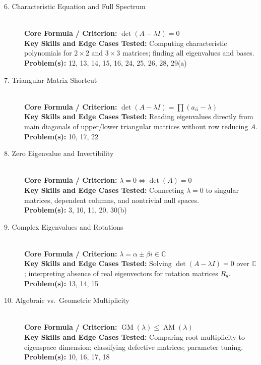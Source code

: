\documentclass[11pt, letterpaper]{article}
\theoremstyle{definition}
\theoremstyle{remark}
\begin{document}
\begin{description}
    \item[6. Characteristic Equation and Full Spectrum] \hfill \\
    \textbf{Core Formula / Criterion:} $\det(A - \lambda I) = 0$ \\
    \textbf{Key Skills and Edge Cases Tested:} Computing characteristic polynomials for $2\times 2$ and $3\times 3$ matrices; finding all eigenvalues and bases. \\
    \textbf{Problem(s):} 12, 13, 14, 15, 16, 24, 25, 26, 28, 29(a)

    \item[7. Triangular Matrix Shortcut] \hfill \\
    \textbf{Core Formula / Criterion:} $\det(A - \lambda I) = \prod (a_{ii} - \lambda)$ \\
    \textbf{Key Skills and Edge Cases Tested:} Reading eigenvalues directly from main diagonals of upper/lower triangular matrices without row reducing $A$. \\
    \textbf{Problem(s):} 10, 17, 22

    \item[8. Zero Eigenvalue and Invertibility] \hfill \\
    \textbf{Core Formula / Criterion:} $\lambda = 0 \iff \det(A) = 0$ \\
    \textbf{Key Skills and Edge Cases Tested:} Connecting $\lambda = 0$ to singular matrices, dependent columns, and nontrivial null spaces. \\
    \textbf{Problem(s):} 3, 10, 11, 20, 30(b)

    \item[9. Complex Eigenvalues and Rotations] \hfill \\
    \textbf{Core Formula / Criterion:} $\lambda = \alpha \pm \beta i \in \mathbb{C}$ \\
    \textbf{Key Skills and Edge Cases Tested:} Solving $\det(A - \lambda I) = 0$ over $\mathbb{C}$; interpreting absence of real eigenvectors for rotation matrices $R_\theta$. \\
    \textbf{Problem(s):} 13, 14, 15

    \item[10. Algebraic vs.\ Geometric Multiplicity] \hfill \\
    \textbf{Core Formula / Criterion:} $\operatorname{GM}(\lambda) \le \operatorname{AM}(\lambda)$ \\
    \textbf{Key Skills and Edge Cases Tested:} Comparing root multiplicity to eigenspace dimension; classifying defective matrices; parameter tuning. \\
    \textbf{Problem(s):} 10, 16, 17, 18


\end{description}
\end{document}
